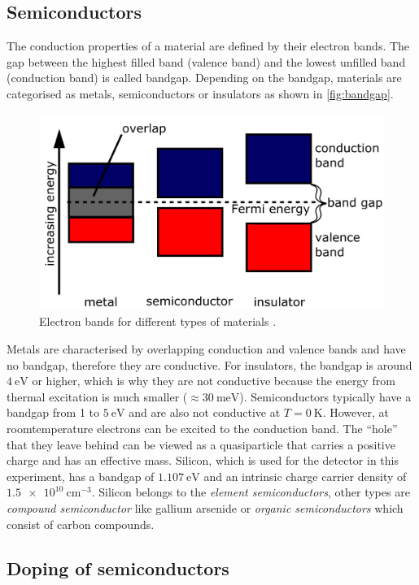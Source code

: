 \subsection{Semiconductors}
\label{subsec:Semiconductors}
The conduction properties of a material are defined by their electron bands. The gap between the highest filled band (valence band) and the lowest unfilled band (conduction band)
is called bandgap. Depending on the bandgap, materials are categorised as metals, semiconductors or insulators as shown in \autoref{fig:bandgap}.
\begin{figure}
    \centering 
    \includegraphics[width = .6\textwidth]{content/pics/Band_gap.png}
    \caption{Electron bands for different types of materials \cite{Bandgap}.}
    \label{fig:bandgap}
\end{figure}
Metals are characterised by overlapping conduction and valence bands and have no bandgap, therefore they are conductive. 
For insulators, the bandgap is around $\qty{4}{\eV}$ or higher, which is why they are not conductive because the energy from thermal excitation 
is much smaller ($\approx\qty{30}{\milli\eV}$). Semiconductors typically have a bandgap from 1 to $\qty{5}{\eV}$ and are also not conductive at 
$T = \qty{0}{\kelvin}$. However, at roomtemperature electrons can be excited to the conduction band. The \enquote{hole} that they leave behind can be viewed as a quasiparticle that 
carries a positive charge and has an effective mass. Silicon, which is used for the detector in this experiment, has a bandgap of $\qty{1.107}{\eV}$ and an intrinsic charge 
carrier density of $\qty{1.5e10}{\centi\metre^{-3}}$. Silicon belongs to the \textit{element semiconductors}, other types are \textit{compound semiconductor} 
like gallium arsenide or \textit{organic semiconductors} which consist of carbon compounds.

\subsection{Doping of semiconductors}

